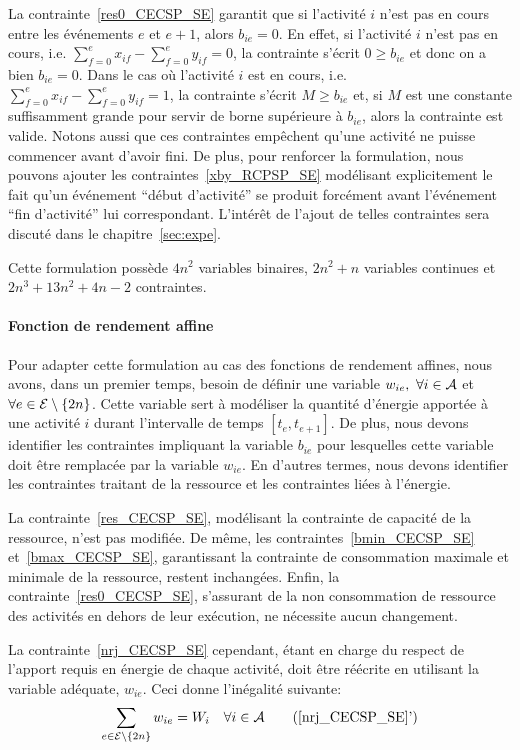La contrainte~\eqref{res0_CECSP_SE} garantit que si l'activité $i$
n'est pas en cours entre les événements $e$ et $e+1$, alors
$b_{ie}=0$. En effet, si l'activité $i$ n'est pas en cours,
i.e. $\sum_{f=0}^{e} x_{if}-\sum_{f=0}^{e}y_{if}=0$, la contrainte
s'écrit $0\ge b_{ie}$ et donc on a bien $b_{ie} =0$. Dans le cas où
l'activité $i$ est en cours, i.e. $\sum_{f=0}^{e} x_{if}
-\sum_{f=0}^{e}y_{if}=1$, la contrainte s'écrit $M\ge b_{ie}$ et, si
$M$ est une constante suffisamment grande pour servir de borne
supérieure à $b_{ie}$, alors la contrainte est valide. Notons aussi
que ces contraintes empêchent qu'une activité ne puisse commencer
avant d'avoir fini. De plus, pour renforcer la formulation, nous
pouvons ajouter les contraintes~\eqref{xby_RCPSP_SE} modélisant
explicitement le fait qu'un événement ``début d'activité'' se produit
forcément avant l'événement ``fin d'activité'' lui
correspondant. L'intérêt de l'ajout de telles contraintes sera discuté
dans le chapitre~\ref{sec:expe}.

Cette formulation possède $4n^2$ variables binaires, $2n^2+n$
variables continues et $2n^3+13n^2+4n-2$ contraintes.

\paragraph{Fonction de rendement affine}

Pour adapter cette formulation au cas des fonctions de rendement
affines, nous avons, dans un premier temps, besoin de définir une
variable $w_{ie},\ \forall i \in {\cal A}$ et $\forall e \in {\cal E}
\setminus\{2n\}$. Cette variable sert à modéliser la quantité
d'énergie apportée à une activité $i$ durant l'intervalle de temps
$[t_e,t_{e+1}]$. De plus, nous devons identifier les contraintes
impliquant la variable $b_{ie}$ pour lesquelles cette variable doit
être remplacée par la variable $w_{ie}$. En d'autres termes, nous
devons identifier les contraintes traitant de la ressource et les
contraintes liées à l'énergie.

La contrainte~\eqref{res_CECSP_SE}, modélisant la contrainte de
capacité de la ressource, n'est pas modifiée. De même, les
contraintes~\eqref{bmin_CECSP_SE} et~\eqref{bmax_CECSP_SE},
garantissant la contrainte de consommation maximale et minimale de la
ressource, restent inchangées. Enfin, la
contrainte~\eqref{res0_CECSP_SE}, s'assurant de la non consommation de
ressource des activités en dehors de leur exécution, ne nécessite
aucun changement.

La contrainte~\eqref{nrj_CECSP_SE} cependant, étant en charge du
respect de l'apport requis en énergie de chaque activité, doit être
réécrite en utilisant la variable adéquate, $w_{ie}$. Ceci donne
l'inégalité suivante:
\begin{equation} 
\sum_{e\in \E\setminus\{2n\}} w_{ie} = W_i\quad \forall i \in \A
\tag{\ref{nrj_CECSP_SE}'}
\label{nrj2_CECSP_SE}
\end{equation} 


